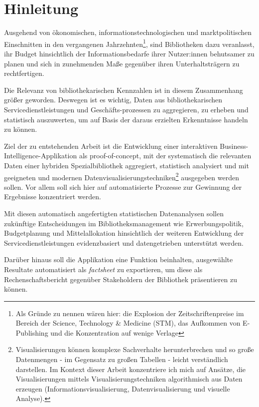\chapter{Hinleitung}
%
Ausgehend von ökonomischen, informationstechnologischen und marktpolitischen Einschnitten in den
vergangenen Jahrzehnten\footnote{Als Gründe zu nennen wären hier: die Explosion der Zeitschriftenpreise im Bereich der
Science, Technology \& Medicine (STM), das Aufkommen von E-Publishing und die Konzentration auf wenige
Verlage},
sind Bibliotheken dazu veranlasst, ihr Budget hinsichtlich der Informationsbedarfe
ihrer Nutzer:innen behutsamer zu planen und sich in zunehmenden Maße gegenüber ihren Unterhaltsträgern zu rechtfertigen.

Die Relevanz von bibliothekarischen Kennzahlen ist in diesem Zusammenhang größer geworden.
Deswegen ist es wichtig, Daten aus bibliothekarischen Servicedienstleistungen und Geschäfts-prozessen zu aggregieren, zu erheben und statistisch
auszuwerten, um auf Basis der daraus erzielten Erkenntnisse handeln zu können.

Ziel der zu entstehenden Arbeit ist die Entwicklung einer
interaktiven Business-Intelligence-Applikation als proof-of-concept,
mit der systematisch die relevanten Daten einer hybriden Spezialbibliothek aggregiert, statistisch
analysiert und mit geeigneten und modernen Datenvisualisierungstechniken\footnote{Visualisierungen können komplexe Sachverhalte herunterbrechen und
so große Datenmengen - im Gegensatz zu großen Tabellen - leicht verständlich
darstellen. Im Kontext dieser Arbeit konzentriere ich mich auf Ansätze, die Visualisierungen mittels Visualisierungstechniken algorithmisch aus
Daten erzeugen (Informationsvisualisierung, Datenvisualisierung und visuelle Analyse).\cite{RN100}}
ausgegeben werden sollen.
Vor allem soll sich hier auf automatisierte Prozesse zur Gewinnung der Ergebnisse konzentriert werden.

Mit diesen automatisch angefertigten statistischen Datenanalysen sollen zukünftige
Entscheidungen im Bibliotheksmanagement wie Erwerbungspolitik, Budgetplanung und
Mittelallokation hinsichtlich der weiteren Entwicklung der
Servicedienstleistungen evidenzbasiert und datengetrieben unterstützt werden.

Darüber hinaus soll die Applikation  eine Funktion beinhalten, ausgewählte
Resultate automatisiert als \textit{factsheet} zu exportieren, um diese
als Rechenschaftsbericht gegenüber Stakeholdern der Bibliothek präsentieren zu können.

